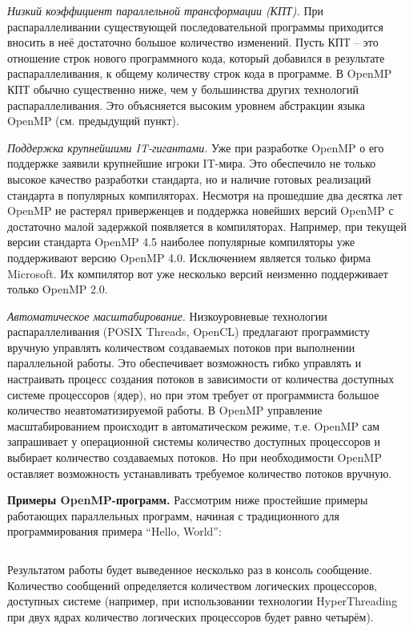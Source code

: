 \textit{Низкий коэффициент параллельной трансформации (КПТ).} При распараллеливании существующей последовательной программы приходится вносить в неё достаточно большое количество изменений. Пусть КПТ -- это отношение строк нового программного кода, который добавился в результате распараллеливания, к общему количеству строк кода в программе. В OpenMP КПТ обычно существенно ниже, чем у большинства других технологий распараллеливания. Это объясняется высоким уровнем абстракции языка OpenMP (см. предыдущий пункт). 

\textit{Поддержка крупнейшими  IT-гигантами.} Уже при разработке Open\-MP о его поддержке заявили крупнейшие игроки IT-мира. Это обеспечило не только высокое качество разработки стандарта, но и наличие готовых реализаций стандарта в популярных компиляторах. Несмотря на прошедшие два десятка лет OpenMP не растерял приверженцев и поддержка новейших версий OpenMP с достаточно малой задержкой появляется в компиляторах. Например, при текущей версии стандарта OpenMP 4.5 наиболее популярные компиляторы уже поддерживают версию OpenMP 4.0. Исключением является только фирма Microsoft. Их компилятор вот уже несколько версий неизменно поддерживает только OpenMP 2.0. 

\textit{Автоматическое масштабирование.}  Низкоуровневые технологии распараллеливания (POSIX Threads, OpenCL) предлагают программисту вручную управлять количеством создаваемых потоков при выполнении параллельной работы. Это обеспечивает возможность гибко управлять и настраивать процесс создания потоков в зависимости от количества доступных системе процессоров (ядер), но при этом требует от программиста большое количество неавтоматизируемой работы. В OpenMP управление масштабированием происходит в автоматическом режиме, т.е. OpenMP сам запрашивает у операционной системы количество доступных процессоров и выбирает количество создаваемых потоков. Но при необходимости OpenMP оставляет возможность устанавливать требуемое количество потоков вручную.

\textbf{Примеры OpenMP-программ.} Рассмотрим ниже простейшие примеры работающих параллельных программ, начиная с традиционного для программирования примера ``Hello, World'':
\inputminted{c++}{listings/OpenMPExample1.cpp}

Результатом работы будет выведенное несколько раз в консоль сообщение. Количество сообщений определяется количеством логических процессоров, доступных системе (например, при использовании технологии HyperThreading при двух ядрах количество логических процессоров будет равно четырём). 

